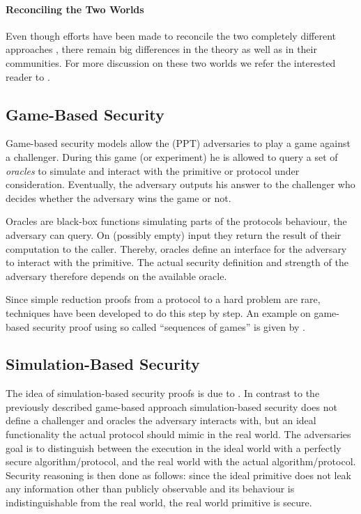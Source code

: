 \paragraph{Reconciling the Two Worlds}
Even though efforts have been made to reconcile the two completely different approaches \cite{Abadi2002,Herzog2005}, there remain big differences in the theory as well as in their communities.
For more discussion on these two worlds we refer the interested reader to \cite{cortier2011survey}.

\subsection{Game-Based Security}
Game-based security models allow the (\ac{PPT}) adversaries to play a game against a challenger.
During this game (or experiment) he is allowed to query a set of \emph{oracles} to simulate and interact with the primitive or protocol under consideration.
Eventually, the adversary outputs his answer to the challenger who decides whether the adversary wins the game or not.

Oracles are black-box functions simulating parts of the protocols behaviour, the adversary can query.
On (possibly empty) input they return the result of their computation to the caller.
Thereby, oracles define an interface for the adversary to interact with the primitive.
The actual security definition and strength of the adversary therefore depends on the available oracle.

Since simple reduction proofs from a protocol to a hard problem are rare, techniques have been developed to do this step by step.
An example on game-based security proof using so called ``sequences of games'' is given by \citet{Shoup2004}.

\subsection{Simulation-Based Security}
The idea of simulation-based security proofs is due to \citet{Goldreich87}.
In contrast to the previously described game-based approach simulation-based security does not define a challenger and oracles the adversary interacts with, but an ideal functionality the actual protocol should mimic in the real world.
The adversaries goal is to distinguish between the execution in the ideal world with a perfectly secure algorithm/protocol, and the real world with the actual algorithm/protocol.
Security reasoning is then done as follows: since the ideal primitive does not leak any information other than publicly observable and its behaviour is indistinguishable from the real world, the real world primitive is secure.

